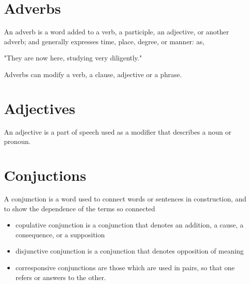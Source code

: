\documentclass{book}
\begin{document}
\chapter{Adverbs}

An adverb is a word added to a verb, a participle, an adjective, or another adverb; and generally expresses time, place, degree, or manner: as,

"They are now here, studying very diligently."

Adverbs can modify a verb, a clause, adjective or a phrase. 

\chapter{Adjectives}

An adjective is a part of speech used as a modifier that describes a noun or pronoun.

\chapter{Conjuctions}

A conjunction is a word used to connect words or sentences in construction, and to show the dependence of the terms so connected

\begin{itemize}
	\item copulative conjunction is a conjunction that denotes an addition, a cause, a consequence, or a supposition
	\item disjunctive conjunction is a conjunction that denotes opposition of meaning
	\item corresponsive conjunctions are those which are used in pairs, so that one refers or answers to the other.
\end{itemize}
\end{document}
